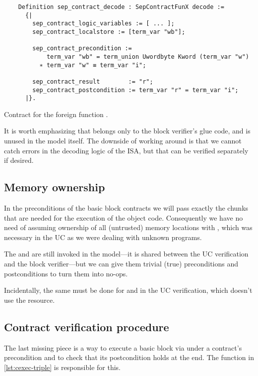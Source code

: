 \begin{listing}[htb]
  \begin{verbatim}
    Definition sep_contract_decode : SepContractFunX decode :=
      {|
        sep_contract_logic_variables := [ ... ];
        sep_contract_localstore := [term_var "wb"];

        sep_contract_precondition :=
            term_var "wb" = term_union Uwordbyte Kword (term_var "w")
          ∗ term_var "w" ≡ term_var "i";

        sep_contract_result        := "r";
        sep_contract_postcondition := term_var "r" = term_var "i";
      |}.
  \end{verbatim}
  \caption{Contract for the foreign function .}
  \label{lst:decode}
\end{listing}

It is worth emphasizing that  belongs only to the block verifier's glue code, and is unused in the model itself. The downside of working around  is that we cannot catch errors in the decoding logic of the ISA, but that can be verified separately if desired.

\subsection{Memory ownership}

In the preconditions of the basic block contracts we will pass exactly the  chunks that are needed for the execution of the object code. Consequently we have no need of assuming ownership of all (untrusted) memory locations with , which was necessary in the UC as we were dealing with unknown programs.

The  and  are still invoked in the \usail model---it is shared between the UC verification and the block verifier---but we can give them trivial (true) preconditions and postconditions to turn them into no-ops.

Incidentally, the same must be done for  and  in the UC verification, which doesn't use the  resource.

\subsection{Contract verification procedure}

The last missing piece is a way to execute a basic block via  under a contract's precondition and to check that its postcondition holds at the end. The function  in \cref{lst:cexec-triple} is responsible for this.

